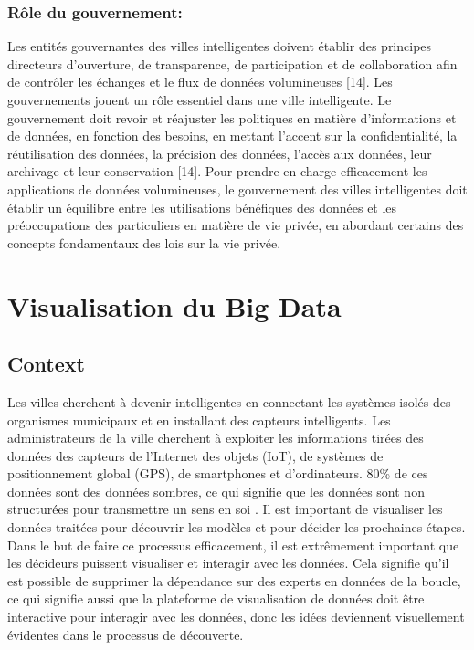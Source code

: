 \documentclass[french, a4paper, 12pt]{report}
\begin{document}
\subsubsection{Rôle du gouvernement:}
Les entités gouvernantes des villes intelligentes doivent établir des principes directeurs d'ouverture, de transparence, de participation et de collaboration afin de contrôler les échanges et le flux de données volumineuses [14]. Les gouvernements jouent un rôle essentiel dans une ville intelligente. Le gouvernement doit revoir et réajuster les politiques en matière d'informations et de données, en fonction des besoins, en mettant l'accent sur la confidentialité, la réutilisation des données, la précision des données, l'accès aux données, leur archivage et leur conservation [14]. 
Pour prendre en charge efficacement les applications de données volumineuses, le gouvernement des villes intelligentes doit établir un équilibre entre les utilisations bénéfiques des données et les préoccupations des particuliers en matière de vie privée, en abordant certains des concepts fondamentaux des lois sur la vie privée.\\


\section{Visualisation du Big Data }
\subsection{Context}
Les villes cherchent à devenir intelligentes en connectant les systèmes isolés des organismes municipaux et en installant des capteurs intelligents. Les administrateurs de la ville cherchent à exploiter les informations tirées des données des capteurs de l'Internet des objets (IoT), de systèmes de positionnement global (GPS), de smartphones et d'ordinateurs. 80\% de ces données sont des données sombres, ce qui signifie que les données sont non structurées pour transmettre un sens en soi \cite{10}.
Il est important de visualiser les données traitées pour découvrir les modèles et pour décider les prochaines étapes. Dans le but de faire ce processus efficacement, il est extrêmement important que les décideurs puissent visualiser et interagir avec les données.
Cela signifie qu'il est possible de supprimer la dépendance sur des experts en données de la boucle, ce qui signifie aussi que la plateforme de visualisation de données doit être interactive pour interagir avec les données, donc les idées deviennent visuellement évidentes dans le processus de découverte.
\end{document}
